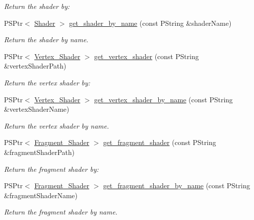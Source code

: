 \begin{DoxyCompactItemize}
\begin{DoxyCompactList}\small\item\em Return the shader by\+: \end{DoxyCompactList}\item 
P\+S\+Ptr$<$ \mbox{\hyperlink{classprz_1_1_shader}{Shader}} $>$ \mbox{\hyperlink{classprz_1_1_shader___loader_a4b30fda72b2a2d19fe0b1af223dc9264}{get\+\_\+shader\+\_\+by\+\_\+name}} (const P\+String \&shader\+Name)
\begin{DoxyCompactList}\small\item\em Return the shader by name. \end{DoxyCompactList}\item 
P\+S\+Ptr$<$ \mbox{\hyperlink{classprz_1_1_vertex___shader}{Vertex\+\_\+\+Shader}} $>$ \mbox{\hyperlink{classprz_1_1_shader___loader_a048561e8c18f09fff2eaf758b6efd79f}{get\+\_\+vertex\+\_\+shader}} (const P\+String \&vertex\+Shader\+Path)
\begin{DoxyCompactList}\small\item\em Return the vertex shader by\+: \end{DoxyCompactList}\item 
P\+S\+Ptr$<$ \mbox{\hyperlink{classprz_1_1_vertex___shader}{Vertex\+\_\+\+Shader}} $>$ \mbox{\hyperlink{classprz_1_1_shader___loader_a3f91c84b6fe8b57444de25fb6d467a51}{get\+\_\+vertex\+\_\+shader\+\_\+by\+\_\+name}} (const P\+String \&vertex\+Shader\+Name)
\begin{DoxyCompactList}\small\item\em Return the vertex shader by name. \end{DoxyCompactList}\item 
P\+S\+Ptr$<$ \mbox{\hyperlink{classprz_1_1_fragment___shader}{Fragment\+\_\+\+Shader}} $>$ \mbox{\hyperlink{classprz_1_1_shader___loader_ac62062dc69aae5e6f709852507fcd581}{get\+\_\+fragment\+\_\+shader}} (const P\+String \&fragment\+Shader\+Path)
\begin{DoxyCompactList}\small\item\em Return the fragment shader by\+: \end{DoxyCompactList}\item 
P\+S\+Ptr$<$ \mbox{\hyperlink{classprz_1_1_fragment___shader}{Fragment\+\_\+\+Shader}} $>$ \mbox{\hyperlink{classprz_1_1_shader___loader_a038668ed01e3660616bb5c9b4afc9867}{get\+\_\+fragment\+\_\+shader\+\_\+by\+\_\+name}} (const P\+String \&fragment\+Shader\+Name)
\begin{DoxyCompactList}\small\item\em Return the fragment shader by name. \end{DoxyCompactList}\end{DoxyCompactItemize}
